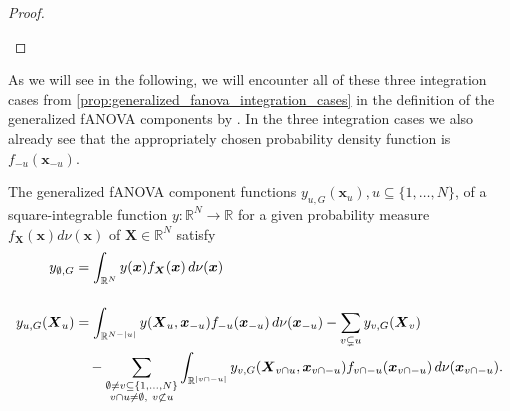 \begin{proof}
\begin{center}
\end{center}
\end{proof}
As we will see in the following, we will encounter all of these three integration cases from \autoref{prop:generalized_fanova_integration_cases} in the definition of the generalized fANOVA components by \cite{rahman2014}.
In the three integration cases we also already see that the appropriately chosen probability density function is $f_{-u}(\boldsymbol{x}_{-u})$.
\begin{proposition}\label{prop:generalized_fanova_components_rahman}
The generalized fANOVA component functions \( y_{u,G}(\boldsymbol{x}_u), u \subseteq \{1,\dots,N\} \), of a square-integrable function $y:\mathbb{R}^N \to \mathbb{R}$ for a given probability measure $f_{\boldsymbol{X}}(\boldsymbol{x}) d\nu(\boldsymbol{x})$ of $\boldsymbol{X} \in \mathbb{R}^N$ satisfy
\begin{align}
y_{\emptyset,G} &= \int_{\mathbb{R}^N} y(\boldsymbol{x}) f_{\boldsymbol{X}}(\boldsymbol{x}) \, d \nu(\boldsymbol{x}) \\[3ex]
y_{u,G}(\boldsymbol{X}_u) &= \int_{\mathbb{R}^{N - |u|}} y(\boldsymbol{X}_u, \boldsymbol{x}_{-u}) f_{-u}(\boldsymbol{x}_{-u}) \, d \nu(\boldsymbol{x}_{-u})
- \sum_{v \subsetneq u} y_{v,G}(\boldsymbol{X}_v) \notag \\
&\quad - \sum_{\substack{\emptyset \ne v \subseteq \{1,\dots,N\} \\ v \cap u \ne \emptyset,\ v \not\subset u}} 
\int_{\mathbb{R}^{|v \cap -u|}} y_{v,G}(\boldsymbol{X}_{v \cap u}, \boldsymbol{x}_{v \cap -u}) f_{v \cap -u}(\boldsymbol{x}_{v \cap -u}) \, d \nu(\boldsymbol{x}_{v \cap -u}).
\end{align}
\end{proposition}
